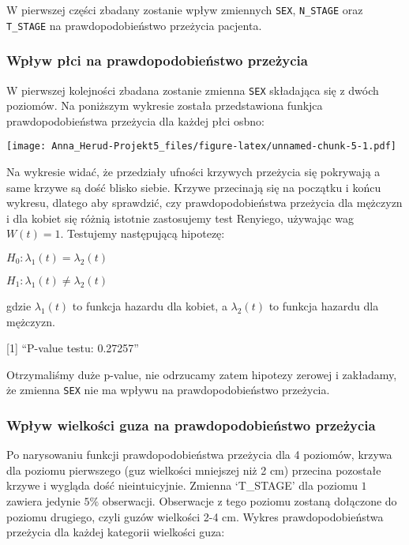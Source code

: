 \documentclass[
]{article}
\begin{document}
W pierwszej części zbadany zostanie wpływ zmiennych \texttt{SEX},
\texttt{N\_STAGE} oraz \texttt{T\_STAGE} na prawdopodobieństwo przeżycia
pacjenta.

\hypertarget{wpux142yw-pux142ci-na-prawdopodobieux144stwo-przeux17cycia}{%
\subsubsection{Wpływ płci na prawdopodobieństwo
przeżycia}\label{wpux142yw-pux142ci-na-prawdopodobieux144stwo-przeux17cycia}}

W pierwszej kolejności zbadana zostanie zmienna \texttt{SEX} składająca
się z dwóch poziomów. Na poniższym wykresie została przedstawiona
funkjca prawdopodobieństwa przeżycia dla każdej płci osbno:

\texttt{[image: Anna\_Herud-Projekt5\_files/figure-latex/unnamed-chunk-5-1.pdf]}

Na wykresie widać, że przedziały ufności krzywych przeżycia się
pokrywają a same krzywe są dość blisko siebie. Krzywe przecinają się na
początku i końcu wykresu, dlatego aby sprawdzić, czy prawdopodobieństwa
przeżycia dla mężczyzn i dla kobiet się różnią istotnie zastosujemy test
Renyiego, używając wag \(W(t) = 1\). Testujemy następującą hipotezę:

\(H_0: \lambda_{1}(t)=\lambda_{2}(t)\)

\(H_1:\lambda_{1}(t)\neq \lambda_{2}(t)\)

gdzie \(\lambda_{1}(t)\) to funkcja hazardu dla kobiet, a
\(\lambda_{2}(t)\) to funkcja hazardu dla mężczyzn.

{[}1{]} ``P-value testu: 0.27257''

Otrzymaliśmy duże p-value, nie odrzucamy zatem hipotezy zerowej i
zakładamy, że zmienna \texttt{SEX} nie ma wpływu na prawdopodobieństwo
przeżycia.

\hypertarget{wpux142yw-wielkoux15bci-guza-na-prawdopodobieux144stwo-przeux17cycia}{%
\subsubsection{Wpływ wielkości guza na prawdopodobieństwo
przeżycia}\label{wpux142yw-wielkoux15bci-guza-na-prawdopodobieux144stwo-przeux17cycia}}

Po narysowaniu funkcji prawdopodobieństwa przeżycia dla 4 poziomów,
krzywa dla poziomu pierwszego (guz wielkości mniejszej niż 2 cm)
przecina pozostałe krzywe i wygląda dość nieintuicyjnie. Zmienna
`T\_STAGE' dla poziomu \(1\) zawiera jedynie \(5\%\) obserwacji.
Obserwacje z tego poziomu zostaną dołączone do poziomu drugiego, czyli
guzów wielkości 2-4 cm. Wykres prawdopodobieństwa przeżycia dla każdej
kategorii wielkości guza:
\end{document}
